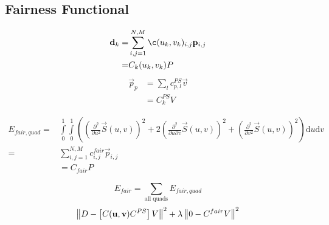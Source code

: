 \subsection{Fairness Functional}%



\begin{align}
\vec{d}_k = & \sum\limits_{i,j=1}^{N,M} \c(u_k,v_k)_{i,j} \lsControlPointi{i,j}
\\=& C_k (u_k,v_k)P
\end{align}
\begin{align}
\vec{p}_{p} &= \sum\limits_{l} c^{PS}_{p,l} \vec{v} 
\\
&=C_k^{PS}V
\end{align}

\begin{align}
\label{eq:fairness}
E_{fair,quad} =& 
\int\limits_0^1 \int\limits_0^1
\left(
(\frac{\partial^2}{\partial u^2 }\vec{S}(u,v))^2
+ 2 
(\frac{\partial^2}{\partial u\partial v} \vec{S}(u,v))^2
+
(\frac{\partial^2}{\partial v^2}\vec{S}(u,v))^2
\right)
\text{d}u\text{d}v
\\
=& \sum\limits_{i,j=1}^{N,M} c_{i,j}^{fair}\vec{p}_{i,j}
\\
&=
C_{fair} P
\end{align}

\begin{equation}
\label{eq:fairness-sum}
E_{fair} = \sum\limits_{\text{all quads}}E_{fair,quad}
\end{equation}
\begin{equation}
\norm{D - \left[ C(\vec{u},\vec{v}) C^{PS} \right] V }^2 + \lambda \norm{0 - C^{fair} V }^2
\end{equation}

